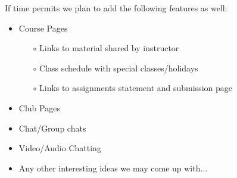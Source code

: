 \documentclass{report}
\begin{document}
\newpage
\noindent If time permits we plan to add the following features as well:
\begin{itemize}
    \item Course Pages
    \begin{itemize}
        \item[$\circ$] Links to material shared by instructor
        \item[$\circ$] Class schedule with special classes/holidays
        \item[$\circ$] Links to assignments statement and submission page
    \end{itemize}
    \item Club Pages
    \item Chat/Group chats
    \item Video/Audio Chatting
    \item Any other interesting ideas we may come up with...
\end{itemize}
\end{document}
